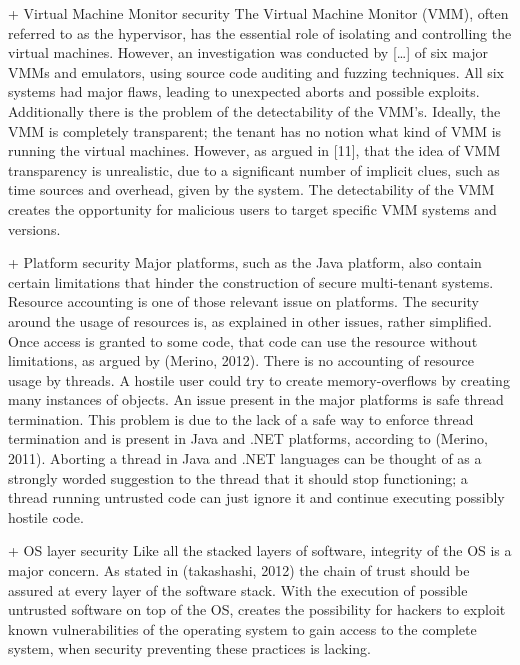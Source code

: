 + Virtual Machine Monitor security
The Virtual Machine Monitor (VMM), often referred to as the hypervisor, has the essential role of isolating and controlling the virtual machines. However, an investigation was conducted by […] of six major VMMs and emulators, using source code auditing and fuzzing techniques. All six systems had major flaws, leading to unexpected aborts and possible exploits.
Additionally there is the problem of the detectability of the VMM’s. Ideally, the VMM is completely transparent; the tenant has no notion what kind of VMM is running the virtual machines. However, as argued in [11], that the idea of VMM transparency is unrealistic, due to a significant number of implicit clues, such as time sources and overhead, given by the system. The detectability of the VMM creates the opportunity for malicious users to target specific VMM systems and versions.

+ Platform security
Major platforms, such as the Java platform, also contain certain limitations that hinder the construction of secure multi-tenant systems. Resource accounting is one of those relevant issue on platforms. The security around the usage of resources is, as explained in other issues, rather simplified. Once access is granted to some code, that code can use the resource without limitations, as argued by (Merino, 2012). There is no accounting of resource usage by threads. A hostile user could try to create memory-overflows by creating many instances of objects.
An issue present in the major platforms is safe thread termination. This problem is due to the lack of a safe way to enforce thread termination and is present in Java and .NET platforms, according to (Merino, 2011). Aborting a thread in Java and .NET languages can be thought of as a strongly worded suggestion to the thread that it should stop functioning; a thread running untrusted code can just ignore it and continue executing possibly hostile code.

+ OS layer security
Like all the stacked layers of software, integrity of the OS is a major concern. As stated in (takashashi, 2012) the chain of trust should be assured at every layer of the software stack. With the execution of possible untrusted software on top of the OS, creates the possibility for hackers to exploit known vulnerabilities of the operating system to gain access to the complete system, when security preventing these practices is lacking.

